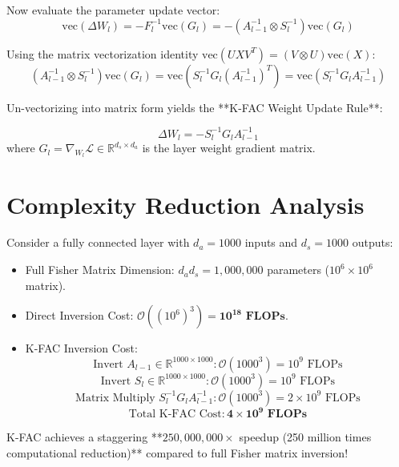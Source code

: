 Now evaluate the parameter update vector:
\begin{equation}
\text{vec}(\Delta W_l) = - F_l^{-1} \text{vec}(G_l) = - (A_{l-1}^{-1} \otimes S_l^{-1}) \text{vec}(G_l)
\end{equation}

Using the matrix vectorization identity $\text{vec}(U X V^T) = (V \otimes U) \text{vec}(X)$:
\begin{equation}
(A_{l-1}^{-1} \otimes S_l^{-1}) \text{vec}(G_l) = \text{vec}\left( S_l^{-1} G_l (A_{l-1}^{-1})^T \right) = \text{vec}\left( S_l^{-1} G_l A_{l-1}^{-1} \right)
\end{equation}

Un-vectorizing into matrix form yields the **K-FAC Weight Update Rule**:

\begin{mathbox}
\begin{equation}
\Delta W_l = - S_l^{-1} G_l A_{l-1}^{-1}
\end{equation}
where $G_l = \nabla_{W_l} \mathcal{L} \in \mathbb{R}^{d_s \times d_a}$ is the layer weight gradient matrix.
\end{mathbox}


\section{Complexity Reduction Analysis}
Consider a fully connected layer with $d_a = 1000$ inputs and $d_s = 1000$ outputs:
\begin{itemize}[leftmargin=*]
    \item Full Fisher Matrix Dimension: $d_a d_s = 1,000,000$ parameters ($10^6 \times 10^6$ matrix).
    \item Direct Inversion Cost: $\mathcal{O}((10^6)^3) = \mathbf{10^{18} \text{ FLOPs}}$.
    \item K-FAC Inversion Cost:
    $$\text{Invert } A_{l-1} \in \mathbb{R}^{1000 \times 1000}: \mathcal{O}(1000^3) = 10^9 \text{ FLOPs}$$
    $$\text{Invert } S_l \in \mathbb{R}^{1000 \times 1000}: \mathcal{O}(1000^3) = 10^9 \text{ FLOPs}$$
    $$\text{Matrix Multiply } S_l^{-1} G_l A_{l-1}^{-1}: \mathcal{O}(1000^3) = 2 \times 10^9 \text{ FLOPs}$$
    $$\text{Total K-FAC Cost}: \mathbf{4 \times 10^9 \text{ FLOPs}}$$
\end{itemize}

K-FAC achieves a staggering **$250,000,000\times$ speedup (250 million times computational reduction)** compared to full Fisher matrix inversion!

